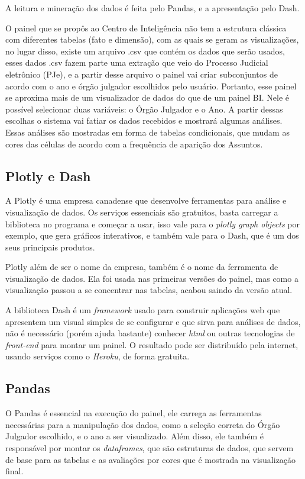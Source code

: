 A leitura e mineração dos dados é feita pelo Pandas, e a apresentação pelo Dash. 

O painel que se propôs ao Centro de Inteligência não tem a estrutura clássica com diferentes tabelas (fato e dimensão), com as quais se geram as visualizações, no lugar disso, existe um arquivo .csv que contém os dados que serão usados, esses dados .csv fazem parte uma extração que veio do Processo Judicial eletrônico (PJe), e a partir desse arquivo o painel vai criar subconjuntos de acordo com o ano e órgão julgador escolhidos pelo usuário. Portanto, esse painel se aproxima mais de um visualizador de dados do que de um painel BI. Nele é possível selecionar duas variáveis: o Órgão Julgador e o Ano. A partir dessas escolhas o sistema vai fatiar os dados recebidos e mostrará algumas análises. Essas análises são mostradas em forma de tabelas condicionais, que mudam as cores das células de acordo com a frequência de aparição dos Assuntos.

\subsection{Plotly e Dash}

A Plotly é uma empresa canadense que desenvolve ferramentas para análise e visualização de dados. Os serviços essenciais são gratuitos, basta carregar a biblioteca no programa e começar a usar, isso vale para o \textit{plotly graph objects} por exemplo, que gera gráficos interativos, e também vale para o Dash, que é um dos seus principais produtos. 

Plotly além de ser o nome da empresa, também é o nome da ferramenta de visualização de dados. Ela foi usada nas primeiras versões do painel, mas como a visualização passou a se concentrar nas tabelas, acabou saindo da versão atual.

A biblioteca Dash é um \textit{framework} usado para construir aplicações web que apresentem um visual simples de se configurar e que sirva para análises de dados, não é necessário (porém ajuda bastante) conhecer \textit{html} ou outras tecnologias de \textit{front-end} para montar um painel. O resultado pode ser distribuído pela internet, usando serviços como o \textit{Heroku}, de forma gratuita.

\subsection{Pandas}

O Pandas é essencial na execução do painel, ele carrega as ferramentas necessárias para a manipulação dos dados, como a seleção correta do Órgão Julgador escolhido, e o ano a ser visualizado. Além disso, ele também é responsável por montar os \textit{dataframes}, que são estruturas de dados, que servem de base para as tabelas e as avaliações por cores que é mostrada na visualização final.

